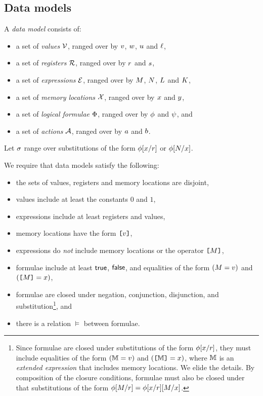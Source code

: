 \subsection{Data models}
\label{sec:preliminaries}

A \emph{data model} consists of:
\begin{itemize}
\item a set of \emph{values} $\mathcal{V}$, ranged over by
  $v$, $w$, $u$ and $\ell$,
\item a set of \emph{registers} $\mathcal{R}$, ranged over by
  $r$ and $s$,
\item a set of \emph{expressions} $\mathcal{E}$, ranged over by
  $M$, $N$, $L$ and $K$,
\item a set of \emph{memory locations} $\mathcal{X}$, ranged over by $x$ and
  $y$, 
\item a set of \emph{logical formulae} $\Phi$, ranged over by
  $\phi$ and $\psi$, and
\item a set of \emph{actions} $\mathcal{A}$, ranged over by $a$ and $b$.
\end{itemize}

Let $\sigma$ range over substitutions of the form
$\phi[x/r]$ or $\phi[N/x]$.

We require that data models satisfy the following:
\begin{itemize}
\item the sets of values, registers and memory locations are disjoint,
\item values include at least the constants $0$ and $1$,
\item expressions include at least registers and values,
\item memory locations have the form $\texttt{[}v\texttt{]}$,
\item expressions do \emph{not} include memory locations or the operator $\texttt{[}M\texttt{]}$,
\item formulae include at least $\mathsf{true}$, $\mathsf{false}$, and equalities of the form
  $(M=v)$ and $(\texttt{[}M\texttt{]}=x)$,
\item formulae are closed under negation, conjunction, disjunction, and
  substitution\footnote{Since formulae are closed under substitutions of the
    form $\phi[x/r]$, they must include equalities of the form
    $(\mathbb{M}=v)$ and $(\texttt{[}\mathbb{M}\texttt{]}=x)$, where $\mathbb{M}$ is an
    \emph{extended expression} that includes memory locations.  We elide the
    details.  By composition of the closure conditions, formulae must also be
    closed under that substitutions of the form
    $\phi[M/r]=\phi[x/r][M/x]$.}, and
\item there is a relation $\vDash$ between formulae.
\end{itemize}


